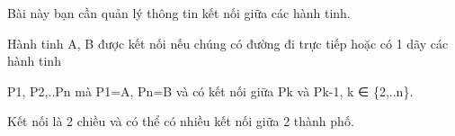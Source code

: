 Bài này bạn cần quản lý thông tin kết nối giữa các hành tinh.

Hành tinh A, B được kết nối nếu chúng có đường đi trực tiếp hoặc có 1 dãy các hành tinh

P1, P2,..Pn mà P1=A, Pn=B và có kết nối giữa Pk và Pk-1, k ∈ \{2,..n\}.

Kết nối là 2 chiều và có thể có nhiều kết nối giữa 2 thành phố.